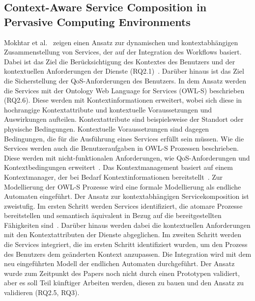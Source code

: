 \documentclass[conference,compsoc,ngerman]{IEEEtran}
\begin{document}
\subsection{Context-Aware Service Composition in Pervasive Computing Environments}
Mokhtar et al.~\cite{mokhtar2005context} zeigen einen Ansatz zur dynamischen und kontextabhängigen Zusammenstellung von Services, der auf der Integration des Workflows basiert. Dabei ist das Ziel die Berücksichtigung des Kontextes des Benutzers und der kontextuellen Anforderungen der Dienste (RQ2.1)~\cite{mokhtar2005context}. Darüber hinaus ist das Ziel die Sicherstellung der QoS-Anforderungen des Benutzers. In dem Ansatz werden die Services mit der Ontology Web Language for Services (OWL-S) beschrieben (RQ2.6). Diese werden mit Kontextinformationen erweitert, wobei sich diese in hochrangige Kontextattribute und kontextuelle Voraussetzungen und Auswirkungen aufteilen. Kontextattribute sind beispielsweise der Standort oder physische Bedingungen. Kontextuelle Voraussetzungen sind dagegen Bedingungen, die für die Ausführung eines Services erfüllt sein müssen. Wie die Services werden auch die Benutzeraufgaben in OWL-S Prozessen beschrieben. Diese werden mit nicht-funktionalen Anforderungen, wie QoS-Anforderungen und Kontextbedingungen erweitert~\cite{mokhtar2005context}. Das Kontextmanagement basiert auf einem Kontextmanager, der bei Bedarf Kontextinformationen bereitstellt~\cite{mokhtar2005context}.
Zur Modellierung der OWL-S Prozesse wird eine formale Modellierung als endliche Automaten eingeführt.
Der Ansatz zur kontextabhängigen Servicekomposition ist zweistufig. Im ersten Schritt werden Services identifiziert, die atomare Prozesse bereitstellen und semantisch äquivalent in Bezug auf die bereitgestellten Fähigkeiten sind~\cite{mokhtar2005context}. Darüber hinaus werden dabei die kontextuellen Anforderungen mit den Kontextattributen der Dienste abgeglichen.
Im zweiten Schritt werden die Services integriert, die im ersten Schritt identifiziert wurden, um den Prozess des Benutzers dem geänderten Kontext anzupassen. Die Integration wird mit dem neu eingeführten Modell der endlichen Automaten durchgeführt.
Der Ansatz wurde zum Zeitpunkt des Papers noch nicht durch einen Prototypen validiert, aber es soll Teil künftiger Arbeiten werden, diesen zu bauen und den Ansatz zu validieren (RQ2.5, RQ3).
\end{document}
